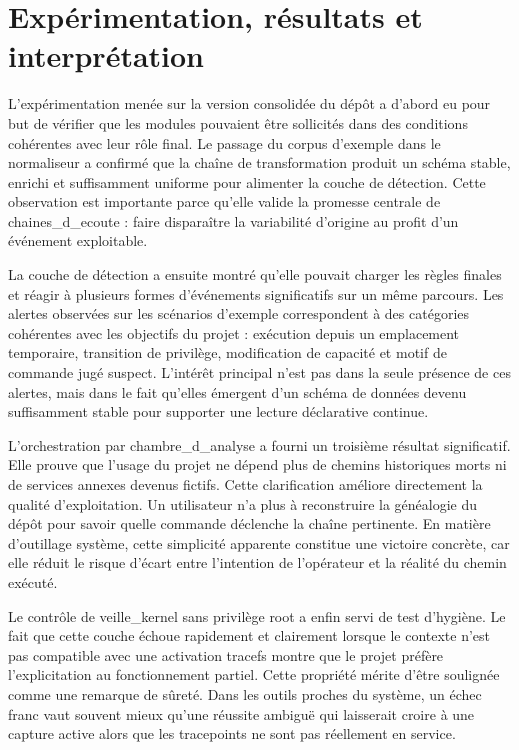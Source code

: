 \documentclass[12pt,a4paper]{report}
\begin{document}
\chapter{Expérimentation, résultats et interprétation}
L’expérimentation menée sur la version consolidée du dépôt a d’abord eu pour but de vérifier que les modules pouvaient être sollicités dans des conditions cohérentes avec leur rôle final. Le passage du corpus d’exemple dans le normaliseur a confirmé que la chaîne de transformation produit un schéma stable, enrichi et suffisamment uniforme pour alimenter la couche de détection. Cette observation est importante parce qu’elle valide la promesse centrale de chaines\_d\_ecoute : faire disparaître la variabilité d’origine au profit d’un événement exploitable.

La couche de détection a ensuite montré qu’elle pouvait charger les règles finales et réagir à plusieurs formes d’événements significatifs sur un même parcours. Les alertes observées sur les scénarios d’exemple correspondent à des catégories cohérentes avec les objectifs du projet : exécution depuis un emplacement temporaire, transition de privilège, modification de capacité et motif de commande jugé suspect. L’intérêt principal n’est pas dans la seule présence de ces alertes, mais dans le fait qu’elles émergent d’un schéma de données devenu suffisamment stable pour supporter une lecture déclarative continue.

L’orchestration par chambre\_d\_analyse a fourni un troisième résultat significatif. Elle prouve que l’usage du projet ne dépend plus de chemins historiques morts ni de services annexes devenus fictifs. Cette clarification améliore directement la qualité d’exploitation. Un utilisateur n’a plus à reconstruire la généalogie du dépôt pour savoir quelle commande déclenche la chaîne pertinente. En matière d’outillage système, cette simplicité apparente constitue une victoire concrète, car elle réduit le risque d’écart entre l’intention de l’opérateur et la réalité du chemin exécuté.

Le contrôle de veille\_kernel sans privilège root a enfin servi de test d’hygiène. Le fait que cette couche échoue rapidement et clairement lorsque le contexte n’est pas compatible avec une activation tracefs montre que le projet préfère l’explicitation au fonctionnement partiel. Cette propriété mérite d’être soulignée comme une remarque de sûreté. Dans les outils proches du système, un échec franc vaut souvent mieux qu’une réussite ambiguë qui laisserait croire à une capture active alors que les tracepoints ne sont pas réellement en service.
\end{document}
